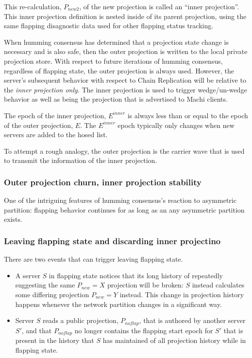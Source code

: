 \documentclass[preprint,10pt]{sigplanconf}
\begin{document}
This re-calculation, $P_{new2}$, of the new projection is called an
``inner projection''.  This inner projection definition is nested
inside of its parent projection, using the same flapping disagnostic
data used for other flapping status tracking.

When humming consensus has determined that a projection state change
is necessary and is also safe, then the outer projection is written to
the local private projection store.
With respect to future iterations of
humming consensus, regardless of flapping state, the outer projection
is always used.
However, the server's subsequent
behavior with respect to Chain Replication will be relative to the
{\em inner projection only}.  The inner projection is used to trigger
wedge/un-wedge behavior as well as being the projection that is
advertised to Machi clients.

The epoch of the inner projection, $E^{inner}$ is always less than or
equal to the epoch of the outer projection, $E$.  The $E^{inner}$
epoch typically only changes when new servers are added to the hosed
list.

To attempt a rough analogy, the outer projection is the carrier wave
that is used to transmit the information of the inner projection.

\subsubsection{Outer projection churn, inner projection stability}

One of the intriguing features of humming consensus's reaction to
asymmetric partition: flapping behavior continues for as long as
an any asymmetric partition exists.

\subsubsection{Leaving flapping state and discarding inner projectino}

There are two events that can trigger leaving flapping state.

\begin{itemize}

\item A server $S$ in flapping state notices that its long history of
  repeatedly suggesting the same $P_{new}=X$ projection will be broken:
  $S$ instead calculates some differing projection $P_{new} = Y$ instead.
  This change in projection history happens whenever the network
  partition changes in a significant way.

\item Server $S$ reads a public projection, $P_{noflap}$, that is
  authored by another server $S'$, and that $P_{noflap}$ no longer
  contains the flapping start epoch for $S'$ that is present in the
  history that $S$ has maintained of all projection history while in
  flapping state.

\end{itemize}
\end{document}
